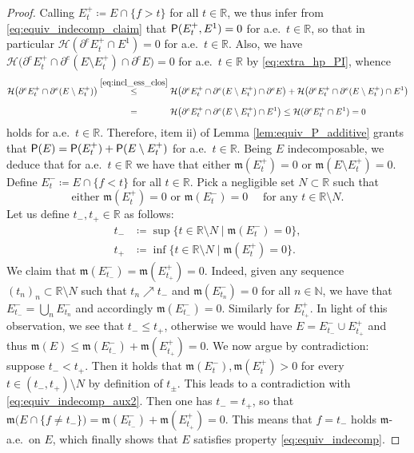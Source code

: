 \documentclass[reqno]{amsart}
\numberwithin{equation}{section}
\newcommand{\N}{\mathbb{N}}
\newcommand{\R}{\mathbb{R}}
\newcommand{\mm}{\mathfrak m}
\newcommand{\1}{\mathbbm 1}
\renewcommand{\P}{{\sf P}}
\renewcommand{\H}{{\mathcal H}}
\begin{document}
\begin{proof}
Calling \(E^+_t\coloneqq E\cap\{f>t\}\) for all \(t\in\R\), we thus infer
from \eqref{eq:equiv_indecomp_claim} that \(\P(E^+_t,E^1)=0\) for a.e.\ \(t\in\R\),
so that in particular \(\H(\partial^e E^+_t\cap E^1)=0\) for a.e.\ \(t\in\R\).
Also, we have
\(\H\big(\partial^e E^+_t\cap\partial^e(E\setminus E^+_t)\cap\partial^e E\big)=0\)
for a.e.\ \(t\in\R\) by \eqref{eq:extra_hp_PI}, whence
\[\begin{split}
\H\big(\partial^e E^+_t\cap\partial^e(E\setminus E^+_t)\big)
&\overset{\eqref{eq:incl_ess_clos}}\leq
\H\big(\partial^e E^+_t\cap\partial^e(E\setminus E^+_t)\cap\partial^e E\big)
+\H\big(\partial^e E^+_t\cap\partial^e(E\setminus E^+_t)\cap E^1\big)\\
&\overset{\phantom{\eqref{eq:incl_ess_clos}}}=
\H\big(\partial^e E^+_t\cap\partial^e(E\setminus E^+_t)\cap E^1\big)
\leq\H(\partial^e E^+_t\cap E^1)=0
\end{split}\]
holds for a.e.\ \(t\in\R\). Therefore, item ii) of Lemma \ref{lem:equiv_P_additive}
grants that \(\P(E)=\P(E^+_t)+\P(E\setminus E^+_t)\) for a.e.\ \(t\in\R\).
Being \(E\) indecomposable, we deduce that for a.e.\ \(t\in\R\)
we have that either \(\mm(E^+_t)=0\) or \(\mm(E\setminus E^+_t)=0\).
Define \(E^-_t\coloneqq E\cap\{f<t\}\) for all \(t\in\R\).
Pick a negligible set \(N\subset\R\) such that
\begin{equation}\label{eq:equiv_indecomp_aux2}
\text{either }\mm(E^+_t)=0\text{ or }\mm(E^-_t)=0
\quad\text{ for any }t\in\R\setminus N.
\end{equation}
Let us define \(t_-,t_+\in\R\) as follows:
\[\begin{split}
t_-&\coloneqq\sup\big\{t\in\R\setminus N\;\big|\;\mm(E^-_t)=0\big\},\\
t_+&\coloneqq\inf\big\{t\in\R\setminus N\;\big|\;\mm(E^+_t)=0\big\}.
\end{split}\]
We claim that \(\mm(E^-_{t_-})=\mm(E^+_{t_+})=0\). Indeed, given any sequence
\((t_n)_n\subset\R\setminus N\) such that \(t_n\nearrow t_-\)
and \(\mm(E^-_{t_n})=0\) for all \(n\in\N\), we have that
\(E^-_{t_-}=\bigcup_n E^-_{t_n}\) and accordingly \(\mm(E^-_{t_-})=0\).
Similarly for \(E^+_{t_+}\). In light of this observation,
we see that \(t_-\leq t_+\), otherwise we would have \(E=E^-_{t_-}\cup E^+_{t_+}\)
and thus \(\mm(E)\leq\mm(E^-_{t_-})+\mm(E^+_{t_+})=0\). We now argue
by contradiction: suppose \(t_-<t_+\). Then it holds that
\(\mm(E^-_t),\mm(E^+_t)>0\) for every \(t\in(t_-,t_+)\setminus N\)
by definition of \(t_\pm\). This leads to a contradiction with
\eqref{eq:equiv_indecomp_aux2}. Then one has \(t_-=t_+\),
so that \(\mm\big(E\cap \{f\neq t_-\}\big)=\mm(E^-_{t_-})+\mm(E^+_{t_+})=0\).
This means that \(f=t_-\) holds \(\mm\)-a.e.\ on \(E\), which
finally shows that \(E\) satisfies property \eqref{eq:equiv_indecomp}.
\end{proof}
\end{document}

